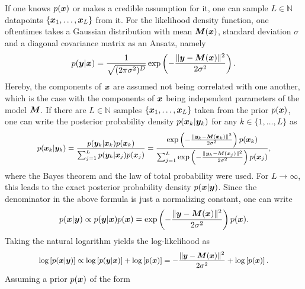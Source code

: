 \documentclass[a4paper,12pt]{report}
\begin{document}
If one knows $p(\bm{x})$ or makes a credible assumption for it, one can sample $L\in \mathbb{N}$ datapoints $\{\bm{x}_{1},\dots,\bm{x}_{L}\}$ from it. For the likelihood density function, one oftentimes takes a Gaussian distribution with mean $\bm{M}(\bm{x})$, standard deviation $\sigma$ and a diagonal covariance matrix as an Ansatz, namely \begin{equation}
p(\bm{y}|\bm{x}) = \frac{1}{\sqrt{(2\pi\sigma^2)^D}}\exp\left(-\frac{\| \bm{y}-\bm{M}(\bm{x})\|^2}{2\sigma^2}\right).
\end{equation} Hereby, the components of $\bm{x}$ are assumed not being correlated with one another, which is the case with the components of $\bm{x}$ being independent parameters of the model $\bm{M}$. If there are $L \in \mathbb{N}$ samples $\{\bm{x}_{1},\dots,\bm{x}_{L}\}$ taken from the prior $p(\bm{x})$, one can write the posterior probability density $p(\bm{x}_k|\bm{y}_k)$ for any $k \in \{1,\dots,L\}$ as \begin{align}\small\begin{aligned}
p(\bm{x}_{k}|\bm{y}_{k}) = \frac{p(\bm{y}_k|\bm{x}_k)p(\bm{x}_k)}{\sum_{j=1}^L p(\bm{y}_k|\bm{x}_j)p(\bm{x}_j)} = \frac{\exp\left(-\frac{\| \bm{y}_k-\bm{M}(\bm{x}_k)\|^2}{2\sigma^2}\right)p(\bm{x}_k)}{\sum_{j=1}^L \exp\left(-\frac{\| \bm{y}_k-\bm{M}(\bm{x}_j)\|^2}{2\sigma^2}\right)p(\bm{x}_j)},
\end{aligned}\end{align} where the Bayes theorem and the law of total probability were used. For $L\rightarrow \infty$, this leads to the exact posterior probability density $p(\bm{x}|\bm{y})$. Since the denominator in the above formula is just a normalizing constant, one can write \begin{equation}
p(\bm{x}|\bm{y}) \propto p(\bm{y}|\bm{x})p(\bm{x}) = \exp\left(-\frac{\|\bm{y}-\bm{M}(\bm{x})\|^2}{2\sigma^2}\right)p(\bm{x}).
\end{equation} Taking the natural logarithm yields the log-likelihood as \begin{align}\small\begin{aligned}
\log\left[p(\bm{x}|\bm{y})\right] \propto \log\left[p(\bm{y}|\bm{x})\right] + \log\left[p(\bm{x})\right] = -\frac{\|\bm{y}-\bm{M}(\bm{x}) \|^2}{2\sigma^2} + \log\left[p(\bm{x})\right].
\end{aligned}\end{align} Assuming a prior $p(\bm{x})$ of the form \begin{equation}

\end{equation}
\end{document}
